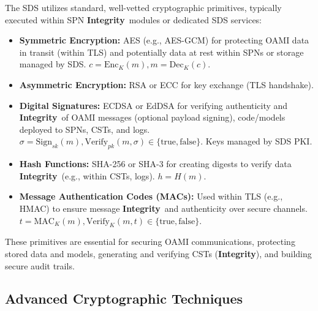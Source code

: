 \documentclass[12pt,a4paper]{report}
\newcommand{\Integrity}{\textbf{Integrity}}
\begin{document}
	The SDS utilizes standard, well-vetted cryptographic primitives, typically executed within SPN \Integrity\ modules or dedicated SDS services:
	\begin{itemize}[noitemsep]
		\item \textbf{Symmetric Encryption:} AES (e.g., AES-GCM) for protecting OAMI data in transit (within TLS) and potentially data at rest within SPNs or storage managed by SDS. $c = \text{Enc}_K(m), m = \text{Dec}_K(c)$.
		\item \textbf{Asymmetric Encryption:} RSA or ECC for key exchange (TLS handshake).
		\item \textbf{Digital Signatures:} ECDSA or EdDSA for verifying authenticity and \Integrity\ of OAMI messages (optional payload signing), code/models deployed to SPNs, CSTs, and logs. $\sigma = \text{Sign}_{sk}(m), \text{Verify}_{pk}(m, \sigma) \in \{\text{true}, \text{false}\}$. Keys managed by SDS PKI.
		\item \textbf{Hash Functions:} SHA-256 or SHA-3 for creating digests to verify data \Integrity\ (e.g., within CSTs, logs). $h = H(m)$.
		\item \textbf{Message Authentication Codes (MACs):} Used within TLS (e.g., HMAC) to ensure message \Integrity\ and authenticity over secure channels. $t = \text{MAC}_K(m), \text{Verify}_K(m, t) \in \{\text{true}, \text{false}\}$.
	\end{itemize}
	These primitives are essential for securing OAMI communications, protecting stored data and models, generating and verifying CSTs (\Integrity), and building secure audit trails.
	
	\subsection{Advanced Cryptographic Techniques} %
	\label{sec:4-3-2} %
	
\end{document}
